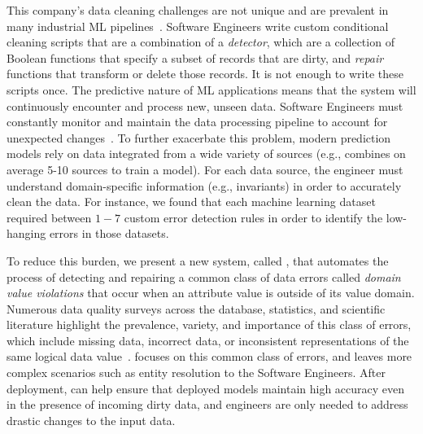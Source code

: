 This company's data cleaning challenges are not unique and are prevalent in many industrial ML pipelines~\cite{krishnan2016hilda}.  
Software Engineers write custom conditional cleaning scripts that are a combination of a {\it detector}, which are a collection of Boolean functions that specify a subset of records that are dirty, and {\it repair} functions that transform or delete those records.  It is not enough to write these scripts once.
The predictive nature of ML applications means that the system will continuously encounter and process new, unseen data.
Software Engineers must constantly monitor and maintain the data processing pipeline to account for unexpected changes~\cite{sculley2014machine, DBLP:conf/sigmod/KrishnanFGWW16}.
To further exacerbate this problem, modern prediction models rely on data integrated from a wide variety of sources (e.g., \company combines on average 5-10 sources to train a model).  For each data source, the engineer must understand domain-specific information (e.g., invariants) in order to accurately clean the data.  For instance, we found that each machine learning dataset required between $1-7$ custom error detection rules in order to identify the low-hanging errors in those datasets.

To reduce this burden, we present a new system, called \sys, that automates the process of detecting and repairing a common class of data errors called {\it domain value violations} that occur when an attribute value is outside of its value domain.  Numerous data quality surveys across the database, statistics, and scientific literature highlight the prevalence, variety, and importance of this class of errors, which include missing data, incorrect data, or inconsistent representations of the same logical data value~\cite{muller2005problems,li2010improving,kim2003taxonomy,kandel2011research}.  \sys focuses on this common class of errors, and leaves more complex scenarios such as entity resolution to the Software Engineers. After deployment, \sys can help ensure that deployed models maintain high accuracy even in the presence of incoming dirty data, and engineers are only needed to address drastic changes to the input data. 

